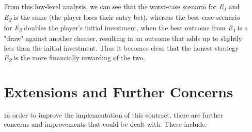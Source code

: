 \documentclass[a4paper, twoside]{article}
\begin{document}
From this low-level analysis, we can see that the worst-case scenario for \textit{E\textsubscript{1}} and \textit{E\textsubscript{2}} is the same (the player loses their entry bet), whereas the best-case scenario for \textit{E\textsubscript{2}} doubles the player's initial investment, when the best outcome from \textit{E\textsubscript{1}} is a "draw" against another cheater, resulting in an outcome that adds up to slightly less than the initial investment. Thus it becomes clear that the honest strategy \textit{E\textsubscript{2}} is the more financially rewarding of the two.

\section{Extensions and Further Concerns}

In order to improve the implementation of this contract, there are further concerns and improvements that could be dealt with. These include:
\end{document}
